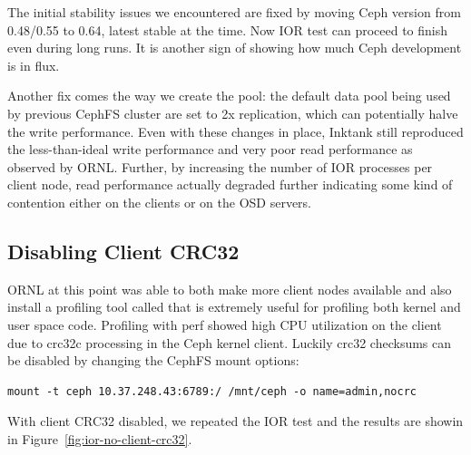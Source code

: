 \documentclass{article}
\begin{document}
The initial stability issues we encountered are fixed by moving Ceph version
from 0.48/0.55 to 0.64, latest stable at the time. Now IOR test can proceed to
finish even during long runs. It is another sign of showing how much Ceph
development is in flux.

Another fix comes the way we create the pool: the default data pool being used
by previous CephFS cluster are set to 2x replication, which can potentially
halve the write performance. Even with these changes in place, Inktank still
reproduced the less-than-ideal write performance and very poor read
performance as observed by ORNL.  Further, by increasing the number of IOR
processes per client node, read performance actually degraded further
indicating some kind of contention either on the clients or on the OSD
servers.


\subsection{Disabling Client CRC32}

ORNL at this point was able to both make more client nodes available and also
install a profiling tool called  that is extremely useful for
profiling both kernel and user space code.  Profiling with perf showed high CPU
utilization on the client due to crc32c processing in the Ceph kernel client. 
Luckily crc32 checksums can be disabled by changing the CephFS mount options:

\begin{Verbatim}
mount -t ceph 10.37.248.43:6789:/ /mnt/ceph -o name=admin,nocrc
\end{Verbatim}


With client CRC32 disabled, we repeated the IOR test and the results are showin
in Figure~\ref{fig:ior-no-client-crc32}. 
\end{document}

